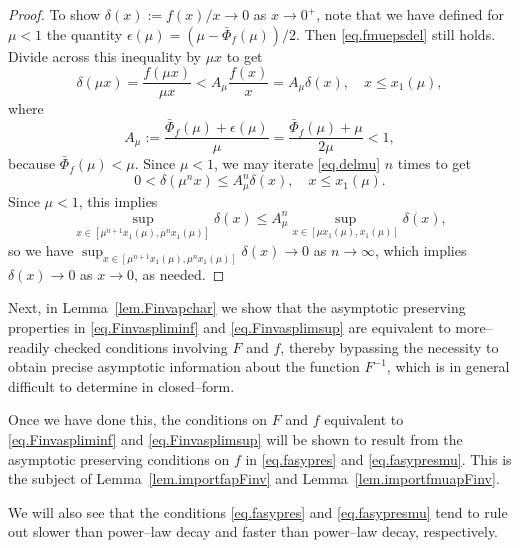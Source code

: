 \documentclass[a4paper,10pt,reqno]{amsart}
\numberwithin{equation}{section}
\theoremstyle{definition}
\theoremstyle{remark}
\DeclareMathOperator{\1}{\mathbbm 1}
\begin{document}
\begin{proof}
		To show $\delta(x):=f(x)/x\to 0$ as $x\to 0^+$, note that we have defined  for $\mu<1$ the quantity
		$\epsilon(\mu)=(\mu-\bar{\Phi}_f(\mu))/2$. Then \eqref{eq.fmuepsdel} still holds. Divide across this inequality by $\mu x$ to get 
		\begin{equation} \label{eq.delmu}
			\delta(\mu x)=\frac{f(\mu x)}{\mu x} < A_\mu  \frac{f(x)}{x}=A_\mu \delta(x), \quad x\leq x_1(\mu),
		\end{equation}
		where  
		\[
		A_\mu:=\frac{\bar{\Phi}_f(\mu)+\epsilon(\mu)}{\mu}
		=\frac{\bar{\Phi}_f(\mu)+\mu}{2\mu}<1,
		\]
		because $\bar{\Phi}_f(\mu)<\mu$. Since $\mu<1$, we may iterate \eqref{eq.delmu} $n$ times to get 
		\[
		0<\delta(\mu^n x)\leq A_\mu^n \delta(x), \quad x\leq x_1(\mu).
		\]
		Since $\mu<1$, this implies
		\[
		\sup_{x\in [\mu^{n+1}x_1(\mu), \mu^n x_1(\mu) ]} \delta(x)
		\leq A_\mu^n \sup_{x\in [\mu x_1(\mu),x_1(\mu)]}\delta(x),
		\]
		so we have $\sup_{x\in [\mu^{n+1}x_1(\mu), \mu^n x_1(\mu) ]} \delta(x)\to 0$ as $n\to\infty$, which implies $\delta(x)\to 0$ as $x\to 0$, as needed. 
	\end{proof}
	
	Next, in Lemma~\ref{lem.Finvapchar} we show that the asymptotic preserving properties in \eqref{eq.Finvaspliminf} and \eqref{eq.Finvasplimsup} are equivalent to more--readily checked conditions involving $F$ and $f$, thereby bypassing the necessity to obtain precise asymptotic information about the function $F^{-1}$, which is in general difficult to determine in closed--form. 
	
	Once we have done this, the conditions on $F$ and $f$ equivalent to \eqref{eq.Finvaspliminf} and \eqref{eq.Finvasplimsup} will be  shown to result from the asymptotic preserving conditions on $f$ in \eqref{eq.fasypres} and \eqref{eq.fasypresmu}. This is the subject of Lemma~\ref{lem.importfapFinv} and Lemma~\ref{lem.importfmuapFinv}.
	
	We will also see that the conditions \eqref{eq.fasypres} and \eqref{eq.fasypresmu} tend to rule out slower than power--law decay and faster than power--law decay, respectively. 
	
\end{document}
